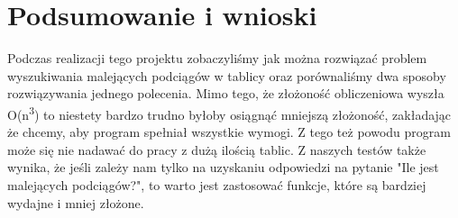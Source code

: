 \documentclass[a4paper,12pt]{article}
\begin{document}
\section{Podsumowanie i wnioski}

Podczas realizacji tego projektu zobaczyliśmy jak można rozwiązać problem wyszukiwania malejących podciągów w tablicy oraz porównaliśmy dwa sposoby rozwiązywania jednego polecenia. Mimo tego, że złożoność obliczeniowa wyszła O(n\textsuperscript{3}) to niestety bardzo trudno byłoby osiągnąć mniejszą złożoność, zakładając że chcemy, aby program spełniał wszystkie wymogi. Z tego też powodu program może się nie nadawać do pracy z dużą ilością tablic. Z naszych testów także wynika, że jeśli zależy nam tylko na uzyskaniu odpowiedzi na pytanie "Ile jest malejących podciągów?", to warto jest zastosować funkcje, które są bardziej wydajne i mniej złożone. 
\end{document}

